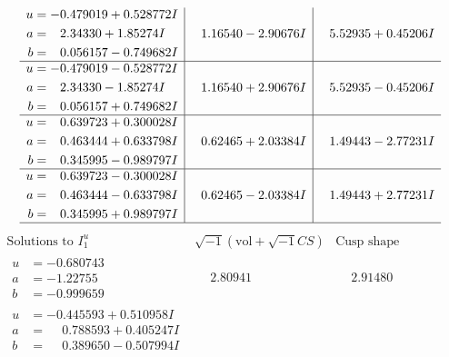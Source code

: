 \documentclass[1p]{elsarticle_modified}
\theoremstyle{definition}
\newcommand{\I}{\sqrt{-1}}
\begin{document}
$$\begin{array}{c|c|c}
\begin{aligned}
u &= -0.479019 + 0.528772 I \\
a &= \phantom{-}2.34330 + 1.85274 I \\
b &= \phantom{-}0.056157 - 0.749682 I\end{aligned}
 & \phantom{-}1.16540 - 2.90676 I & \phantom{-}5.52935 + 0.45206 I \\ \hline\begin{aligned}
u &= -0.479019 - 0.528772 I \\
a &= \phantom{-}2.34330 - 1.85274 I \\
b &= \phantom{-}0.056157 + 0.749682 I\end{aligned}
 & \phantom{-}1.16540 + 2.90676 I & \phantom{-}5.52935 - 0.45206 I \\ \hline\begin{aligned}
u &= \phantom{-}0.639723 + 0.300028 I \\
a &= \phantom{-}0.463444 + 0.633798 I \\
b &= \phantom{-}0.345995 - 0.989797 I\end{aligned}
 & \phantom{-}0.62465 + 2.03384 I & \phantom{-}1.49443 - 2.77231 I \\ \hline\begin{aligned}
u &= \phantom{-}0.639723 - 0.300028 I \\
a &= \phantom{-}0.463444 - 0.633798 I \\
b &= \phantom{-}0.345995 + 0.989797 I\end{aligned}
 & \phantom{-}0.62465 - 2.03384 I & \phantom{-}1.49443 + 2.77231 I\\
 \hline 
 \end{array}$$\newpage$$\begin{array}{c|c|c}  
\text{Solutions to }I^u_{1}& \I (\text{vol} + \sqrt{-1}CS) & \text{Cusp shape}\\
 \hline 
\begin{aligned}
u &= -0.680743\phantom{ +0.000000I} \\
a &= -1.22755\phantom{ +0.000000I} \\
b &= -0.999659\phantom{ +0.000000I}\end{aligned}
 & \phantom{-}2.80941\phantom{ +0.000000I} & \phantom{-}2.91480\phantom{ +0.000000I} \\ \hline\begin{aligned}
u &= -0.445593 + 0.510958 I \\
a &= \phantom{-}0.788593 + 0.405247 I \\
b &= \phantom{-}0.389650 - 0.507994 I\end{aligned}

\end{array}$$
\end{document}
